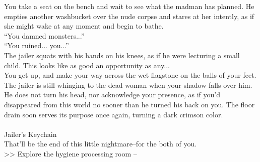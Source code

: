 You take a seat on the bench and wait to see what the madman has planned. He empties another washbucket over the nude corpse and stares at her intently, as if she might wake at any moment and begin to bathe.\\

“You damned monsters...”\\

“You ruined... you...”\\

The jailer squats with his hands on his knees, as if he were lecturing a small child. This looks like as good an opportunity as any...\\

You get up, and make your way across the wet flagstone on the balls of your feet. The jailer is still whinging to the dead woman when your shadow falls over him. He does not turn his head, nor acknowledge your presence, as if you’d disappeared from this world no sooner than he turned his back on you. The floor drain soon serves its purpose once again, turning a dark crimson color.\\
\\
 Jailer’s Keychain\\

That’ll be the end of this little nightmare--for the both of you.\\

>> Explore the hygiene processing room -- 